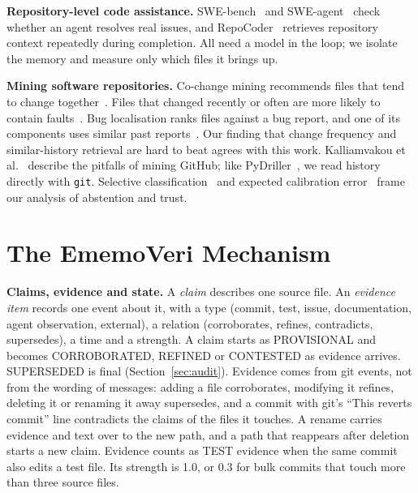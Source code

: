 \documentclass[runningheads]{llncs}
\newcommand{\sys}{EmemoVeri}
\begin{document}
\textbf{Repository-level code assistance.} SWE-bench~\cite{jimenez2024swebench} and SWE-agent~\cite{yang2024sweagent} check whether an agent resolves real issues, and RepoCoder~\cite{zhang2023repocoder} retrieves repository context repeatedly during completion. All need a model in the loop; we isolate the memory and measure only which files it brings up.

\textbf{Mining software repositories.} Co-change mining recommends files that tend to change together~\cite{zimmermann2005mining}. Files that changed recently or often are more likely to contain faults~\cite{kim2007cache,hassan2009complexity}. Bug localisation ranks files against a bug report, and one of its components uses similar past reports~\cite{zhou2012buglocator}. Our finding that change frequency and similar-history retrieval are hard to beat agrees with this work. Kalliamvakou et al.~\cite{kalliamvakou2014perils} describe the pitfalls of mining GitHub; like PyDriller~\cite{spadini2018pydriller}, we read history directly with \texttt{git}. Selective classification~\cite{geifman2017selective} and expected calibration error~\cite{guo2017calibration} frame our analysis of abstention and trust.

\section{The \sys{} Mechanism}
\label{sec:mech}
\textbf{Claims, evidence and state.} A \emph{claim} describes one source file. An \emph{evidence item} records one event about it, with a type (commit, test, issue, documentation, agent observation, external), a relation (corroborates, refines, contradicts, supersedes), a time and a strength. A claim starts as PROVISIONAL and becomes CORROBORATED, REFINED or CONTESTED as evidence arrives. SUPERSEDED is final (Section~\ref{sec:audit}). Evidence comes from git events, not from the wording of messages: adding a file corroborates, modifying it refines, deleting it or renaming it away supersedes, and a commit with git's ``This reverts commit'' line contradicts the claims of the files it touches. A rename carries evidence and text over to the new path, and a path that reappears after deletion starts a new claim. Evidence counts as TEST evidence when the same commit also edits a test file. Its strength is 1.0, or 0.3 for bulk commits that touch more than three source files.
\end{document}
